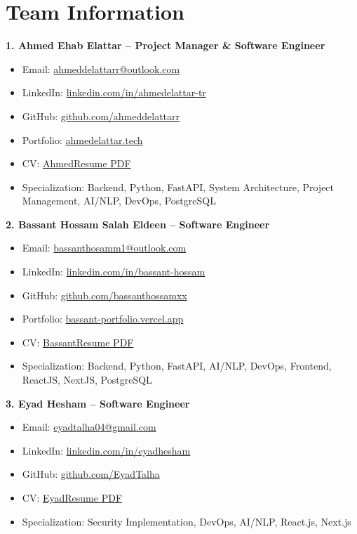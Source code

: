 \documentclass[12pt,a4paper]{article}
\begin{document}
\section*{Team Information}

\textbf{1. Ahmed Ehab Elattar – Project Manager \& Software Engineer}
\begin{itemize}
    \item Email: \href{mailto:ahmeddelattarr@outlook.com}{ahmeddelattarr@outlook.com}
    \item LinkedIn: \href{https://www.linkedin.com/in/ahmedelattar-tr}{linkedin.com/in/ahmedelattar-tr}
    \item GitHub: \href{https://github.com/ahmeddelattarr}{github.com/ahmeddelattarr}
    \item Portfolio: \href{https://www.ahmedelattar.tech}{ahmedelattar.tech}
    \item CV: \href{https://www.ahmedelattar.tech/resume.pdf}{AhmedResume PDF}
    \item Specialization: Backend, Python, FastAPI, System Architecture, Project Management, AI/NLP, DevOps, PostgreSQL
\end{itemize}

\textbf{2. Bassant Hossam Salah Eldeen – Software Engineer}
\begin{itemize}
    \item Email: \href{mailto:bassanthosamm1@outlook.com}{bassanthosamm1@outlook.com}
    \item LinkedIn: \href{https://www.linkedin.com/in/bassant-hossam-5a4177264}{linkedin.com/in/bassant-hossam}
    \item GitHub: \href{https://github.com/Bassanthossamxx}{github.com/bassanthossamxx}
    \item Portfolio: \href{https://bassant-portfolio.vercel.app}{bassant-portfolio.vercel.app}
    \item CV: \href{https://bassant-portfolio.vercel.app/assets/Bassant_Hossam_CV.pdf}{BassantResume PDF}
    \item Specialization: Backend, Python, FastAPI, AI/NLP, DevOps, Frontend, ReactJS, NextJS, PostgreSQL
\end{itemize}

\textbf{3. Eyad Hesham – Software Engineer}
\begin{itemize}
    \item Email: \href{mailto:eyadtalha04@gmail.com}{eyadtalha04@gmail.com}
    \item LinkedIn: \href{https://www.linkedin.com/in/eyadhesham}{linkedin.com/in/eyadhesham}
    \item GitHub: \href{https://github.com/EyadTalha}{github.com/EyadTalha}
    \item CV: \href{https://drive.google.com/file/d/1gIWggXZtLGkVX9wEBdzE1umS1afZiNBz/view?usp=sharing}{EyadResume PDF}
    \item Specialization: Security Implementation, DevOps, AI/NLP, React.js, Next.js
\end{itemize}
\end{document}

